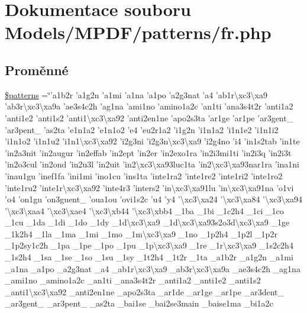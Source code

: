 \hypertarget{fr_8php}{\section{Dokumentace souboru Models/\-M\-P\-D\-F/patterns/fr.php}
\label{fr_8php}
}
\subsection*{Proměnné}
\begin{DoxyCompactItemize}
\item 
\hyperlink{fr_8php_a99c668c59ad650ca9b31ad5313dc5720}{\$patterns} =\char`\"{}'a1b2r 'a1g2n 'a1mi 'a1na 'a1po 'a2g3nat 'a4 'ab1r\textbackslash{}xc3\textbackslash{}xa9 'ab3r\textbackslash{}xc3\textbackslash{}xa9a 'ae3s4c2h 'ag1na 'ami1no 'amino1a2c 'an1ti 'ana3s4t2r 'anti1a2 'anti1e2 'anti1s2 'anti1\textbackslash{}xc3\textbackslash{}xa92 'anti2en1ne 'apo2s3ta 'ar1ge 'ar1pe 'ar3gent\-\_\- 'ar3pent\-\_\- 'as2ta 'e1n1a2 'e1n1o2 'e4 'eu2r1a2 'i1g2n 'i1n1a2 'i1n1e2 'i1n1i2 'i1n1o2 'i1n1u2 'i1n1\textbackslash{}xc3\textbackslash{}xa92 'i2g3ni 'i2g3n\textbackslash{}xc3\textbackslash{}xa9 'i2g4no 'i4 'in1s2tab 'in1te 'in2a3nit 'in2augur 'in2effab 'in2ept 'in2er 'in2exo1ra 'in2i3mi1ti 'in2i3q 'in2i3t 'in2o3cul 'in2ond 'in2u3l 'in2uit 'in2\textbackslash{}xc3\textbackslash{}xa93luc1ta 'in2\textbackslash{}xc3\textbackslash{}xa93nar1ra 'ina1ni 'inau1gu 'inef1fa 'ini1mi 'ino1cu 'ins1ta 'inte1ra2 'inte1re2 'inte1ri2 'inte1ro2 'inte1ru2 'inte1r\textbackslash{}xc3\textbackslash{}xa92 'inte4r3 'inters2 'in\textbackslash{}xc3\textbackslash{}xa91lu 'in\textbackslash{}xc3\textbackslash{}xa91na 'o1vi 'o4 'on1gu 'on3guent\-\_\- 'oua1ou 'ovi1s2c 'u4 'y4 '\textbackslash{}xc3\textbackslash{}xa24 '\textbackslash{}xc3\textbackslash{}xa84 '\textbackslash{}xc3\textbackslash{}xa94 '\textbackslash{}xc3\textbackslash{}xaa4 '\textbackslash{}xc3\textbackslash{}xae4 '\textbackslash{}xc3\textbackslash{}xb44 '\textbackslash{}xc3\textbackslash{}xbb4 \-\_\-1ba \-\_\-1bi \-\_\-1c2h4 \-\_\-1ci \-\_\-1co \-\_\-1cu \-\_\-1da \-\_\-1di \-\_\-1do \-\_\-1dy \-\_\-1d\textbackslash{}xc3\textbackslash{}xa9 \-\_\-1d\textbackslash{}xc3\textbackslash{}xa93s2o3d\textbackslash{}xc3\textbackslash{}xa9 \-\_\-1ge \-\_\-1k2h4 \-\_\-1la \-\_\-1ma \-\_\-1mi \-\_\-1mo \-\_\-1m\textbackslash{}xc3\textbackslash{}xa9 \-\_\-1no \-\_\-1p2h4 \-\_\-1p2l \-\_\-1p2r \-\_\-1p2sy1c2h \-\_\-1pa \-\_\-1pe \-\_\-1po \-\_\-1pu \-\_\-1p\textbackslash{}xc3\textbackslash{}xa9 \-\_\-1re \-\_\-1r\textbackslash{}xc3\textbackslash{}xa9 \-\_\-1s2c2h4 \-\_\-1s2h4 \-\_\-1sa \-\_\-1se \-\_\-1so \-\_\-1su \-\_\-1sy \-\_\-1t2h4 \-\_\-1t2r \-\_\-1ta \-\_\-a1b2r \-\_\-a1g2n \-\_\-a1mi \-\_\-a1na \-\_\-a1po \-\_\-a2g3nat \-\_\-a4 \-\_\-ab1r\textbackslash{}xc3\textbackslash{}xa9 \-\_\-ab3r\textbackslash{}xc3\textbackslash{}xa9a \-\_\-ae3s4c2h \-\_\-ag1na \-\_\-ami1no \-\_\-amino1a2c \-\_\-an1ti \-\_\-ana3s4t2r \-\_\-anti1a2 \-\_\-anti1e2 \-\_\-anti1s2 \-\_\-anti1\textbackslash{}xc3\textbackslash{}xa92 \-\_\-anti2en1ne \-\_\-apo2s3ta \-\_\-ar1de \-\_\-ar1ge \-\_\-ar1pe \-\_\-ar3dent\-\_\- \-\_\-ar3gent\-\_\- \-\_\-ar3pent\-\_\- \-\_\-as2ta \-\_\-bai1se \-\_\-bai2se3main \-\_\-baise1ma \-\_\-bi1a2c 
\end{DoxyCompactItemize}
